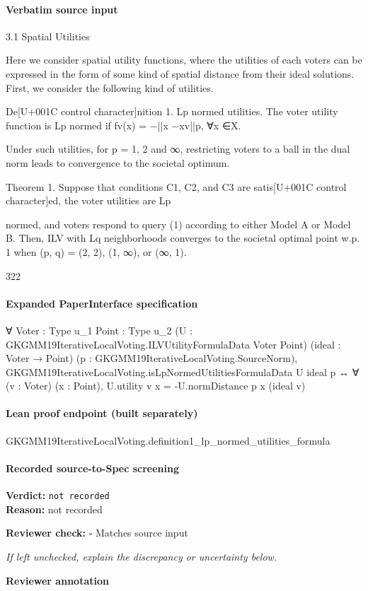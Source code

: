 \documentclass[10pt]{article}
\newcommand{\reviewerbox}{%
  \par\noindent\fbox{\parbox{0.96\linewidth}{\rule{0pt}{0.38in}}}\par
}
\newcommand{\reviewmatch}[1]{%
  \par\noindent\textbf{Reviewer check:} $\square$\; #1\par
  \noindent\emph{If left unchecked, explain the discrepancy or uncertainty below.}\par
}
\begin{document}
\paragraph{Verbatim source input}
\begin{ReviewVerbatim}
3.1 Spatial Utilities

Here we consider spatial utility functions, where the utilities of each voters can be expressed
in the form of some kind of spatial distance from their ideal solutions. First, we consider
the following kind of utilities.

De[U+001C control character]nition 1. Lp normed utilities. The voter utility function is Lp normed if fv(x) =
−||x −xv||p, ∀x ∈X.

Under such utilities, for p = 1, 2 and ∞, restricting voters to a ball in the dual norm
leads to convergence to the societal optimum.

Theorem 1. Suppose that conditions C1, C2, and C3 are satis[U+001C control character]ed, the voter utilities are Lp

normed, and voters respond to query (1) according to either Model A or Model B. Then,
ILV with Lq neighborhoods converges to the societal optimal point w.p. 1 when (p, q) = (2, 2),
(1, ∞), or (∞, 1).

322
\end{ReviewVerbatim}


\paragraph{Expanded PaperInterface specification}
\begin{ReviewVerbatim}
∀ {Voter : Type u_1} {Point : Type u_2} (U : GKGMM19IterativeLocalVoting.ILVUtilityFormulaData Voter Point)
  (ideal : Voter → Point) (p : GKGMM19IterativeLocalVoting.SourceNorm),
  GKGMM19IterativeLocalVoting.isLpNormedUtilitiesFormulaData U ideal p ↔
    ∀ (v : Voter) (x : Point), U.utility v x = -U.normDistance p x (ideal v)
\end{ReviewVerbatim}

\paragraph{Lean proof endpoint (built separately)}\begin{ReviewVerbatim}
GKGMM19IterativeLocalVoting.definition1_lp_normed_utilities_formula
\end{ReviewVerbatim}

\paragraph{Recorded source-to-Spec screening}
\textbf{Verdict:} \texttt{not recorded}
\\
\textbf{Reason:} not recorded
\reviewmatch{Matches source input}
\noindent\textbf{Reviewer annotation}\par
\reviewerbox
\clearpage
\hypertarget{source-claim-c46295147d5004f8}{}
\end{document}
